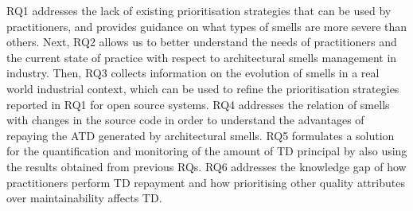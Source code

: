 RQ1 addresses the lack of existing prioritisation strategies that can be used by practitioners, and provides guidance on what types of smells are more severe than others.
Next, RQ2 allows us to better understand the needs of practitioners and the current state of practice with respect to architectural smells management in industry.
Then, RQ3 collects information on the evolution of smells in a real world industrial context, which can be used to refine the prioritisation strategies reported in RQ1 for open source systems.
RQ4 addresses the relation of smells with changes in the source code in order to understand the advantages of repaying the ATD generated by architectural smells.
RQ5 formulates a solution for the quantification and monitoring of the amount of TD principal by also using the results obtained from previous RQs.
RQ6 addresses the knowledge gap of how practitioners perform TD repayment and how prioritising other quality attributes over maintainability affects TD.


